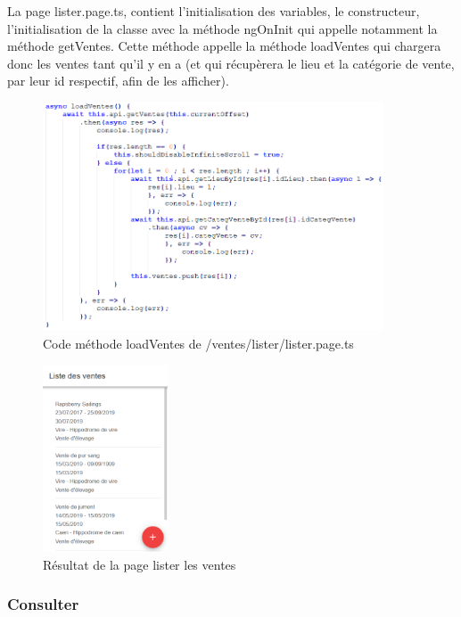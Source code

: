 					La page lister.page.ts, contient l'initialisation des variables, le constructeur, l'initialisation de la classe avec la méthode ngOnInit qui appelle notamment la méthode getVentes. Cette méthode appelle la méthode loadVentes qui chargera donc les ventes tant qu'il y en a (et qui récupèrera le lieu et la catégorie de vente, par leur id respectif, afin de les afficher).

					\begin{figure}[H]
						\centering\includegraphics[width=0.9\textwidth, keepaspectratio]{res/listerTs.png}
						\caption{Code méthode loadVentes de /ventes/lister/lister.page.ts}
					\end{figure}

					\begin{figure}[H]
						\centering\includegraphics[width=0.33\textwidth, keepaspectratio]{res/listerVentes.png}
						\caption{Résultat de la page lister les ventes}
					\end{figure}

			\subsubsection{Consulter}

